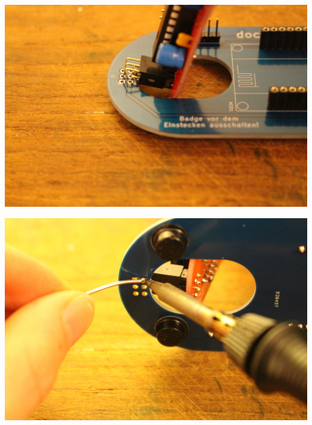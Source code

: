 \documentclass{article}
\begin{document}
\vspace{0.5cm}

\begin{minipage}[b]{0.5\textwidth}
	\includegraphics[width=\textwidth]{Bilder2019/IMG_6484.JPG}
\end{minipage}
\begin{minipage}[b]{0.5\textwidth}
	\includegraphics[width=\textwidth]{Bilder2019/IMG_6485.JPG}
\end{minipage}

\vspace{0.5cm}
\end{document}
